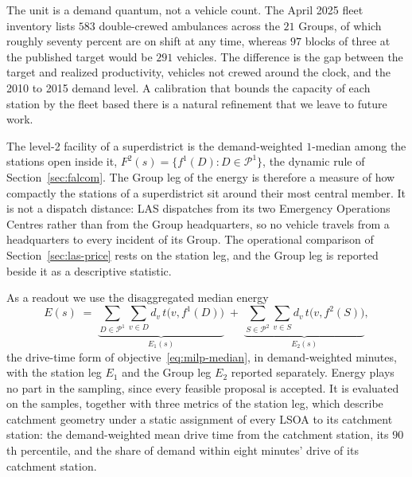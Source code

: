 \documentclass[preprint,12pt,authoryear]{elsarticle}
\theoremstyle{definition}
\newcommand{\Pc}{\mathcal{P}}          %
\begin{document}
The unit is a demand quantum, not a vehicle count. The April 2025 fleet inventory lists $583$ double-crewed ambulances across the $21$ Groups, of which roughly seventy percent are on shift at any time, whereas $97$ blocks of three at the published target would be $291$ vehicles. The difference is the gap between the target and realized productivity, vehicles not crewed around the clock, and the 2010 to 2015 demand level. A calibration that bounds the capacity of each station by the fleet based there is a natural refinement that we leave to future work.

The level-2 facility of a superdistrict is the demand-weighted $1$-median among the stations open inside it, $F^2(s) = \{f^1(D) : D \in \Pc^1\}$, the dynamic rule of Section~\ref{sec:falcom}. The Group leg of the energy is therefore a measure of how compactly the stations of a superdistrict sit around their most central member. It is not a dispatch distance: LAS dispatches from its two Emergency Operations Centres rather than from the Group headquarters, so no vehicle travels from a headquarters to every incident of its Group. The operational comparison of Section~\ref{sec:las-price} rests on the station leg, and the Group leg is reported beside it as a descriptive statistic.

As a readout we use the disaggregated median energy
\[
  E(s) \;=\;
  \underbrace{\sum_{D \in \Pc^1} \sum_{v \in D} d_v \, t\bigl(v, f^1(D)\bigr)}_{E_1(s)}
  \;+\;
  \underbrace{\sum_{S \in \Pc^2} \sum_{v \in S} d_v \, t\bigl(v, f^2(S)\bigr)}_{E_2(s)},
\]
the drive-time form of objective~\eqref{eq:milp-median}, in demand-weighted minutes, with the station leg $E_1$ and the Group leg $E_2$ reported separately. Energy plays no part in the sampling, since every feasible proposal is accepted. It is evaluated on the samples, together with three metrics of the station leg, which describe catchment geometry under a static assignment of every LSOA to its catchment station: the demand-weighted mean drive time from the catchment station, its $90$th percentile, and the share of demand within eight minutes' drive of its catchment station.
\end{document}
